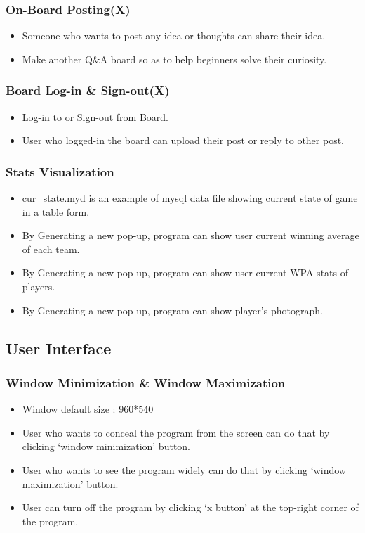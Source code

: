 \documentclass[conference,compsoc, twocolumn]{IEEEtran}
\begin{document}
\subsubsection{On-Board Posting(X)}
\begin{itemize}
\item Someone who wants to post any idea or thoughts can share their idea.
\item Make another Q&A board so as to help beginners solve their curiosity.
\end{itemize}

\subsubsection{Board Log-in \& Sign-out(X)}
\begin{itemize}
\item Log-in to or Sign-out from Board.
\item User who logged-in the board can upload their post or reply to other post.
\end{itemize}

\subsubsection{Stats Visualization}
\begin{itemize}
\item cur\_state.myd is an example of mysql data file showing current state of game in a table form.
\item By Generating a new pop-up, program can show user current winning average of each team.
\item By Generating a new pop-up, program can show user current WPA stats of players.
\item By Generating a new pop-up, program can show player's photograph.
\end{itemize}



\subsection{User Interface}


\subsubsection{Window Minimization & Window Maximization}
\begin{itemize}
\item Window default size : 960*540
\item User who wants to conceal the program from the screen can do that by clicking ‘window minimization’ button.
\item User who wants to see the program widely can do that by clicking ‘window maximization’ button.
\item User can turn off the program by clicking ‘x button’ at the top-right corner of  the program.
\end{itemize}
\end{document}

